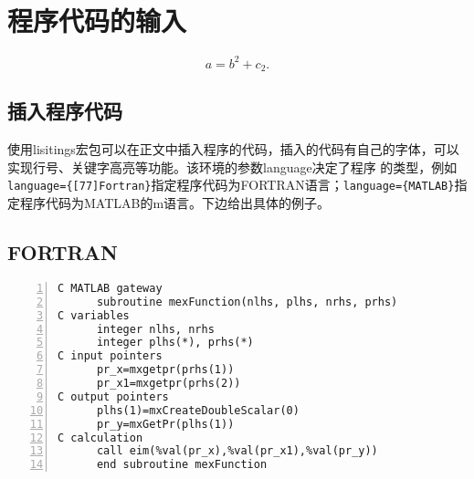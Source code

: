 \makeatletter
{}
  \pagestyle{fancy}%
  \fancyhf{}
\makeatother

\chapter{程序代码的输入}
\label{appendixB}
\renewcommand\theequation{A-\arabic{equation}}
\renewcommand\thefigure{A-\arabic{figure}}
\renewcommand\thetable{A-\arabic{table}}

\begin{equation}\label{B1}
a=b^2+c_2.
\end{equation}

\section{插入程序代码}\label{appendixB-1}
\label{chap}

使用lisitings宏包可以在正文中插入程序的代码，插入的代码有自己的字体，可以实现行号、关键字高亮等功能。该环境的参数language决定了程序
的类型，例如\verb|language={[77]Fortran}|指定程序代码为FORTRAN语言；\verb|language={MATLAB}|指定程序代码为MATLAB的m语言。下边给出具体的例子。

\section{FORTRAN}\label{appendixB-2}

\begin{lstlisting}[language={[77]Fortran},
numbers=left,
numberstyle=\tiny,
basicstyle=\small\ttfamily,
stringstyle=\color{purple},
keywordstyle=\color{blue}\bfseries,
commentstyle=\color{brown},
frame=single]
C MATLAB gateway
      subroutine mexFunction(nlhs, plhs, nrhs, prhs)
C variables
      integer nlhs, nrhs
      integer plhs(*), prhs(*)
C input pointers
      pr_x=mxgetpr(prhs(1))
      pr_x1=mxgetpr(prhs(2))
C output pointers
      plhs(1)=mxCreateDoubleScalar(0)
      pr_y=mxGetPr(plhs(1))
C calculation
      call eim(%val(pr_x),%val(pr_x1),%val(pr_y))
      end subroutine mexFunction
\end{lstlisting}

